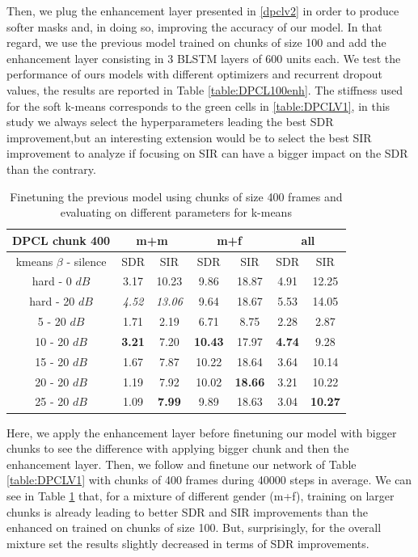 \documentclass[master, tikz, final,11pt, dvipdfmx]{iscs-thesis}
\begin{document}
Then, we plug the enhancement layer presented in \ref{dpclv2} in order to produce softer masks and, in doing so, improving the accuracy of our model. In that regard, we use the previous model trained on chunks of size 100 and add the enhancement layer consisting in 3 BLSTM layers of 600 units each. We test the performance of ours models with different optimizers and recurrent dropout values, the results are reported in Table \ref{table:DPCL100enh}. The stiffness used for the soft k-means corresponds to the green cells in \ref{table:DPCLV1}, in this study we always select the hyperparameters leading the best SDR improvement,but an interesting extension would be to select the best SIR improvement to analyze if focusing on SIR can have a bigger impact on the SDR than the contrary.

\begin{table}[h]
\centering
\begin{tabular}{c|c|c|c|c|c|c}
DPCL chunk 400 & \multicolumn{2}{c|}{m+m} & \multicolumn{2}{c|}{m+f} & \multicolumn{2}{c}{all} \\ 
\hline 
kmeans $\beta$ - silence & SDR & SIR & SDR & SIR & SDR & SIR \\ 
\hline 
hard - 0 $dB$ & 3.17 & 10.23  & 9.86 & 18.87 & 4.91 & 12.25 \\ 
hard - 20 $dB$ & \textit{4.52} & \textit{13.06} & 9.64 & 18.67 & 5.53 & 14.05 \\ 
\hline 
\hline 
5 - 20 $dB$ & 1.71 & 2.19 & 6.71 & 8.75 & 2.28 & 2.87 \\ 
10 - 20 $dB$ & \cellcolor{green}\textbf{3.21} & \cellcolor{green}7.20 & \cellcolor{green}\textbf{10.43} & \cellcolor{green}17.97 & \cellcolor{green}\textbf{4.74} & \cellcolor{green}9.28 \\ 
15 - 20 $dB$ & 1.67 & 7.87 & 10.22 & 18.64 & 3.64 & 10.14 \\ 
20 - 20 $dB$ & 1.19 & 7.92 & 10.02 & \textbf{18.66} & 3.21 & 10.22 \\ 
25 - 20 $dB$ & 1.09 & \textbf{7.99} & 9.89 & 18.63 & 3.04 & \textbf{10.27} \\ 
\end{tabular}
\captionsetup{justification=centering}
\caption{Finetuning the previous model using chunks of size 400 frames and evaluating on different parameters for k-means}
\label{table:DPCL400}
\end{table}

Here, we apply the enhancement layer before finetuning our model with bigger chunks to see the difference with applying bigger chunk and then the enhancement layer. 
Then, we follow \cite{DPCLV2} and finetune our network of Table \ref{table:DPCLV1} with chunks of 400 frames during 40000 steps in average. We can see in Table \ref{table:DPCL400} that, for a mixture of different gender (m+f), training on larger chunks is already leading to better SDR and SIR improvements than the enhanced on trained on chunks of size 100. But, surprisingly, for the overall mixture set the results slightly decreased in terms of SDR improvements.
\end{document}
